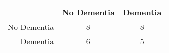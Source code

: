 \begin{table}[ht]
\centering
\begin{tabular}{r|c|c}
  \hline
 & No Dementia & Dementia \\ 
  \hline
No Dementia & 8 & 8 \\ 
  Dementia & 6 & 5 \\ 
   \hline
\end{tabular}
\end{table}
